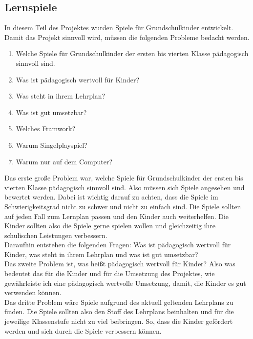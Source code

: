 \subsection{Lernspiele}

In diesem Teil des Projektes wurden Spiele für Grundschulkinder entwickelt. Damit das Projekt sinnvoll wird, müssen die folgenden Probleme bedacht werden.
\begin{enumerate}
    \item Welche Spiele für Grundschulkinder der ersten bis vierten Klasse pädagogisch sinnvoll sind.
    \item Was ist pädagogisch wertvoll für Kinder?
    \item Was steht in ihrem Lehrplan?
    \item Was ist gut umsetzbar?
    \item Welches Framwork?
    \item Warum Singelplayspiel?
    \item Warum nur auf dem Computer?
\end{enumerate}


Das erste große Problem war, welche Spiele für Grundschulkinder der ersten bis vierten Klasse pädagogisch sinnvoll sind. Also müssen sich Spiele angesehen und bewertet werden. Dabei ist wichtig darauf zu achten, dass die Spiele im Schwierigkeitsgrad nicht zu schwer und nicht zu einfach sind. Die Spiele sollten auf jeden Fall zum Lernplan passen und den Kinder auch weiterhelfen. Die Kinder sollten also die Spiele gerne spielen wollen und gleichzeitig ihre schulischen Leistungen verbessern.
\\

Daraufhin entstehen die folgenden Fragen: Was ist pädagogisch wertvoll für Kinder, was steht in ihrem Lehrplan und was ist gut umsetzbar? 
\\

Das zweite Problem ist, was heißt pädagogisch wertvoll für Kinder? Also was bedeutet das für die Kinder und für die Umsetzung des Projektes, wie gewährleiste ich eine pädagogisch wertvolle Umsetzung, damit, die Kinder es gut verwenden können.
\\

Das dritte Problem wäre Spiele aufgrund des aktuell geltenden Lehrplans zu finden. Die Spiele sollten also den Stoff des Lehrplans beinhalten und für die jeweilige Klassenstufe nicht zu viel beibringen. So, dass die Kinder gefördert werden und sich durch die Spiele verbessern können.
\\

